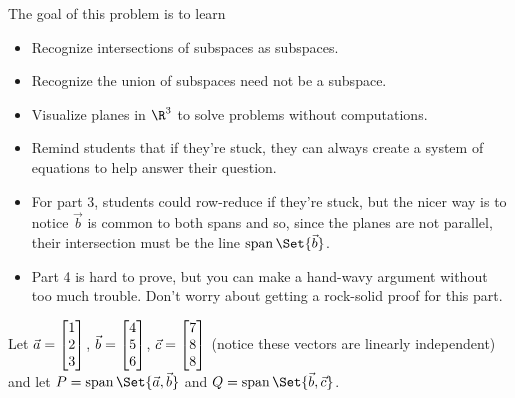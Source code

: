 	\bookonlynewpage
	\question
	\begin{annotation}
		\begin{goals}

			The goal of this problem is to learn
			\begin{itemize}
				\item Recognize intersections of subspaces as subspaces.
				\item Recognize the union of subspaces need not be a subspace.
				\item Visualize planes in $\R^3$ to solve problems without computations.
			\end{itemize}
		\end{goals}

		\begin{notes}
			\begin{itemize}
				\item Remind students that if they're stuck, they can always create a system
					of equations to help answer their question.
				\item For part 3, students could row-reduce if they're stuck, but the nicer
					way is to notice $\vec b$ is common to both spans and so, since the
					planes are not parallel, their intersection must be the line $\Span\Set{\vec b}$.
				\item Part 4 is hard to prove, but you can make a hand-wavy argument without
					too much trouble. Don't worry about getting a rock-solid proof for this part.
			\end{itemize}
		\end{notes}
	\end{annotation}
	Let $\vec a=\mat{1\\2\\3}$, $\vec b=\mat{4\\5\\6}$, $\vec c=\mat{7\\8\\8}$ (notice these vectors
	are linearly independent) and
	let $P=\Span\Set{\vec a,\vec b}$ and $Q=\Span\Set{\vec b,\vec c}$.
